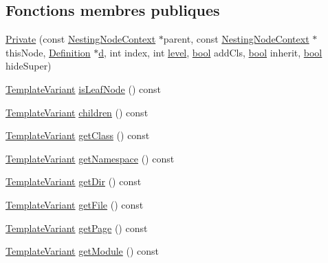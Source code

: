 \subsection*{Fonctions membres publiques}
\begin{DoxyCompactItemize}
\item 
\hyperlink{class_nesting_node_context_1_1_private_afd833b8f39bf1fce3a21b96e15a5de10}{Private} (const \hyperlink{class_nesting_node_context}{Nesting\+Node\+Context} $\ast$parent, const \hyperlink{class_nesting_node_context}{Nesting\+Node\+Context} $\ast$this\+Node, \hyperlink{class_definition}{Definition} $\ast$\hyperlink{060__command__switch_8tcl_af43f4b1f0064a33b2d662af9f06d3a00}{d}, int index, int \hyperlink{class_nesting_node_context_1_1_private_a82129173021c178f5fdb64c16526769d}{level}, \hyperlink{qglobal_8h_a1062901a7428fdd9c7f180f5e01ea056}{bool} add\+Cls, \hyperlink{qglobal_8h_a1062901a7428fdd9c7f180f5e01ea056}{bool} inherit, \hyperlink{qglobal_8h_a1062901a7428fdd9c7f180f5e01ea056}{bool} hide\+Super)
\item 
\hyperlink{class_template_variant}{Template\+Variant} \hyperlink{class_nesting_node_context_1_1_private_ae2a2c20949e07dd74dbbe0a4f4b67172}{is\+Leaf\+Node} () const 
\item 
\hyperlink{class_template_variant}{Template\+Variant} \hyperlink{class_nesting_node_context_1_1_private_a018782c1b2f84277a03576d5f84f544a}{children} () const 
\item 
\hyperlink{class_template_variant}{Template\+Variant} \hyperlink{class_nesting_node_context_1_1_private_aae446a391d25e53542861f4d48b33f65}{get\+Class} () const 
\item 
\hyperlink{class_template_variant}{Template\+Variant} \hyperlink{class_nesting_node_context_1_1_private_a01ee53f6a4ceadcccffa4b02bc971fcc}{get\+Namespace} () const 
\item 
\hyperlink{class_template_variant}{Template\+Variant} \hyperlink{class_nesting_node_context_1_1_private_a5079e5a40433ad980bcaaa87dce19264}{get\+Dir} () const 
\item 
\hyperlink{class_template_variant}{Template\+Variant} \hyperlink{class_nesting_node_context_1_1_private_a36bb453a63e65cabd29a91819fce8ffa}{get\+File} () const 
\item 
\hyperlink{class_template_variant}{Template\+Variant} \hyperlink{class_nesting_node_context_1_1_private_a8fcf1ec336252226087a5921728428ac}{get\+Page} () const 
\item 
\hyperlink{class_template_variant}{Template\+Variant} \hyperlink{class_nesting_node_context_1_1_private_a751fda9df7ce29ec18cfb908bda890a0}{get\+Module} () const 

\end{DoxyCompactItemize}
